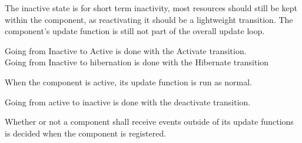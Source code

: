 The inactive state is for short term inactivity, most resources should still be kept within the component, 
as reactivating it should be a lightweight transition.
The component's update function is still not part of the overall update loop.

Going from Inactive to Active is done with the Activate transition.\\
Going from Inactive to hibernation is done with the Hibernate transition

When the component is active, its update function is run as normal.

Going from active to inactive is done with the deactivate transition.

Whether or not a component shall receive events outside of its update functions is decided when the component is registered.
